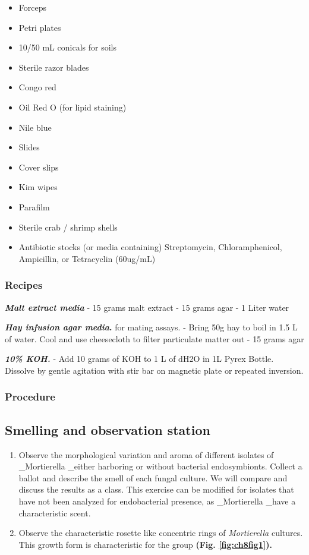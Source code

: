 \documentclass[]{book}
\providecommand{\tightlist}{%
  \setlength{\itemsep}{0pt}\setlength{\parskip}{0pt}}
\begin{document}
\begin{itemize}
\tightlist
\item
  Forceps
\item
  Petri plates
\item
  10/50 mL conicals for soils
\item
  Sterile razor blades
\item
  Congo red
\item
  Oil Red O (for lipid staining)
\item
  Nile blue
\item
  Slides
\item
  Cover slips
\item
  Kim wipes
\item
  Parafilm
\item
  Sterile crab / shrimp shells
\item
  Antibiotic stocks (or media containing) Streptomycin, Chloramphenicol, Ampicillin, or Tetracyclin (60ug/mL)
\end{itemize}

\hypertarget{recipes-1}{%
\subsubsection{Recipes}\label{recipes-1}}

\textbf{\emph{Malt extract media}}
- 15 grams malt extract
- 15 grams agar
- 1 Liter water

\textbf{\emph{Hay infusion agar media}. } for mating assays.
- Bring 50g hay to boil in 1.5 L of water. Cool and use cheesecloth to filter particulate matter out
- 15 grams agar

\textbf{\emph{10\% KOH. }}
- Add 10 grams of KOH to 1 L of dH2O in 1L Pyrex Bottle. Dissolve by gentle agitation with stir bar on magnetic plate or repeated inversion.

\hypertarget{procedure-2}{%
\subsubsection{Procedure}\label{procedure-2}}

\hypertarget{smelling-and-observation-station}{%
\subsection{Smelling and observation station}\label{smelling-and-observation-station}}

\begin{enumerate}
\def\labelenumi{\arabic{enumi}.}
\tightlist
\item
  Observe the morphological variation and aroma of different isolates of \_Mortierella \_either harboring or without bacterial endosymbionts. Collect a ballot and describe the smell of each fungal culture. We will compare and discuss the results as a class. This exercise can be modified for isolates that have not been analyzed for endobacterial presence, as \_Mortierella \_have a characteristic scent.
\item
  Observe the characteristic rosette like concentric rings of \emph{Mortierella} cultures. This growth form is characteristic for the group \textbf{(Fig. \ref{fig:ch8fig1}). }
\end{enumerate}
\end{document}
